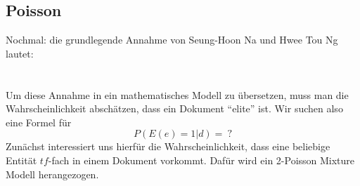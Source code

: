 \subsection{Poisson}
Nochmal: die grundlegende Annahme von Seung-Hoon Na und Hwee Tou Ng lautet:\\
\\
\\
Um diese Annahme in ein mathematisches Modell zu übersetzen, muss man die Wahrscheinlichkeit abschätzen, dass ein Dokument ``elite'' ist. Wir suchen also eine Formel für
\[P\left( E\left( e \right)=1|d \right)=\ ?\]
Zunächst interessiert uns hierfür die Wahrscheinlichkeit, dass eine beliebige Entität $tf$-fach in einem Dokument vorkommt. Dafür wird ein 2-Poisson Mixture Modell herangezogen.

